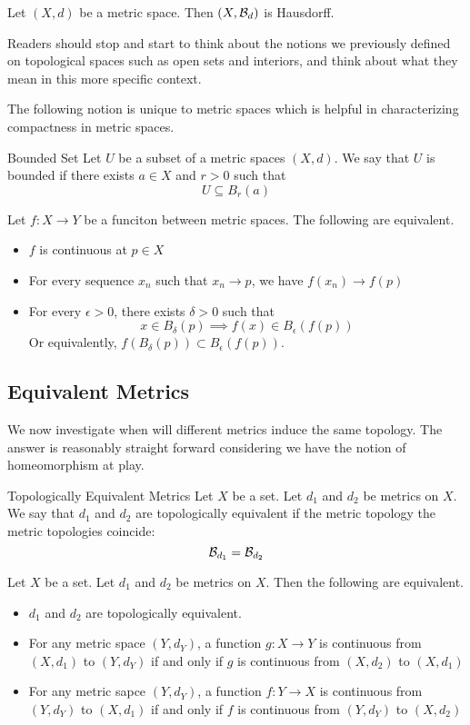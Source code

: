 \documentclass[a4paper]{article}
\begin{document}
\begin{prp}{}{} Let $(X,d)$ be a metric space. Then $(X,\mathcal{B}_d)$ is Hausdorff. 
\end{prp}

Readers should stop and start to think about the notions we previously defined on topological spaces such as open sets and interiors, and think about what they mean in this more specific context. 

The following notion is unique to metric spaces which is helpful in characterizing compactness in metric spaces. 

\begin{defn}{Bounded Set}{} Let $U$ be a subset of a metric spaces $(X,d)$. We say that $U$ is bounded if there exists $a\in X$ and $r>0$ such that $$U\subseteq B_r(a)$$
\end{defn}

\begin{prp}{}{} Let $f:X\to Y$ be a funciton between metric spaces. The following are equivalent. 
\begin{itemize}
\item $f$ is continuous at $p\in X$
\item For every sequence $x_n$ such that $x_n\to p$, we have $f(x_n)\to f(p)$
\item For every $\epsilon>0$, there exists $\delta>0$ such that $$x\in B_{\delta}(p)\implies f(x)\in B_{\epsilon}(f(p))$$ Or equivalently, $f(B_{\delta}(p))\subset B_{\epsilon}(f(p))$. 
\end{itemize}
\end{prp}

\subsection{Equivalent Metrics}
We now investigate when will different metrics induce the same topology. The answer is reasonably straight forward considering we have the notion of homeomorphism at play. 

\begin{defn}{Topologically Equivalent Metrics}{} Let $X$ be a set. Let $d_1$ and $d_2$ be metrics on $X$. We say that $d_1$ and $d_2$ are topologically equivalent if the metric topology the metric topologies coincide: $$\mathcal{B}_{d_1}=\mathcal{B}_{d_2}$$
\end{defn}

\begin{prp}{}{} Let $X$ be a set. Let $d_1$ and $d_2$ be metrics on $X$. Then the following are equivalent. 
\begin{itemize}
\item $d_1$ and $d_2$ are topologically equivalent. 
\item For any metric space $(Y,d_Y)$, a function $g:X\to Y$ is continuous from $(X,d_1)$ to $(Y,d_Y)$ if and only if $g$ is continuous from $(X,d_2)$ to $(X,d_1)$
\item For any metric sapce $(Y,d_Y)$, a function $f:Y\to X$ is continuous from $(Y,d_Y)$ to $(X,d_1)$ if and only if $f$ is continuous from $(Y,d_Y)$ to $(X,d_2)$
\end{itemize}
\end{prp}
\end{document}
